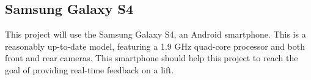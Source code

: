 \subsection{Samsung Galaxy S4}

This project will use the Samsung Galaxy S4\cite{s4}, an Android smartphone. This is a reasonably up-to-date model, featuring a 1.9 GHz quad-core processor and both front and rear cameras. This smartphone should help this project to reach the goal of providing real-time feedback on a lift.